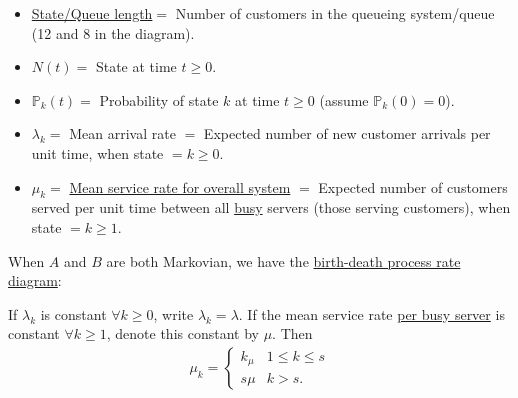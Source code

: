 \begin{definition}
    
    \begin{itemize}
        \item \uline{State/Queue length}$=$ Number of customers in the queueing system/queue (12 and 8 in the diagram).
        \item $N(t) = $ State at time $t\geqslant 0$.
        \item $\mathbb{P}_k(t) = $ Probability of state $k$ at time $t\geqslant 0$ (assume $\mathbb{P}_k(0) = 0$).
        \item $\lambda_k = $ Mean arrival rate $=$ Expected number of new customer arrivals per unit time, when state $=k\geqslant 0$.
        \item $\mu_k = $ \uline{Mean service rate for overall system} $=$ Expected number of customers served per unit time between all \uline{busy} servers (those serving customers), when state $= k\geqslant 1$.
    \end{itemize}
\end{definition}

When $A$ and $B$ are both Markovian, we have the \uline{birth-death process rate diagram}:
\usetikzlibrary{automata}

If $\lambda_k$ is constant $\forall k\geqslant 0$, write $\lambda_k = \lambda$. If the mean service rate \uline{per busy server} is constant $\forall k\geqslant 1$, denote this constant by $\mu$. Then 
\begin{align*}
    \mu_k = \left\lbrace\begin{array}{ll}
       k_{\mu} & 1\leqslant k\leqslant s \\
        s\mu & k>s.
    \end{array} \right.
\end{align*}

